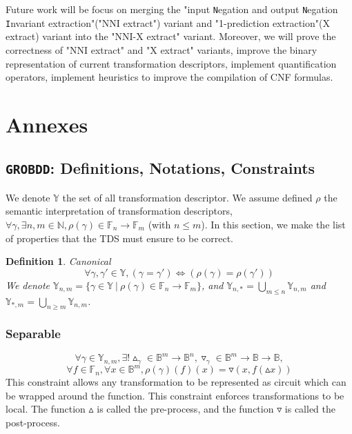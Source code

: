 \documentclass[a4paper,10pt]{article}
\newcommand{\N}{\mathbb{N}}%
\newcommand{\B}{\mathbb{B}}
\newcommand{\F}{\mathbb{F}}
\newcommand{\Y}{\mathbb{Y}}
\newcommand{\NNIextract}{"input \texttt{N}egation and output \texttt{N}egation \texttt{I}nvariant extraction"}
\newcommand{\Xextract}{"1-prediction extraction"}
\newcommand{\GroBdd}{\texttt{GROBDD}}
\newtheorem{newdef}{Definition}
\newcommand{\definition}[2]{\begin{newdef}{#1\\}#2\end{newdef}}
\begin{document}
Future work will be focus on merging the \NNIextract ("NNI extract") variant and \Xextract (X extract) variant into the "NNI-X extract" variant.
Moreover, we will prove the correctness of "NNI extract" and "X extract" variants, improve the binary representation of current transformation descriptors, implement quantification operators, implement heuristics to improve the compilation of CNF formulas.


\newpage
{}


\newpage
\tableofcontents

\newpage

\section{Annexes}

\subsection{\GroBdd{}: Definitions, Notations, Constraints\label{grobdd-def}}

We denote $\Y$ the set of all transformation descriptor.
We assume defined $\rho$ the semantic interpretation of transformation descriptors, $\forall \gamma, \exists n, m \in\N, \rho(\gamma) \in \F_n \rightarrow \F_m$ (with $n\leq m$).
In this section, we make the list of properties that the TDS must ensure to be correct.

\definition{Canonical}
{
\[\forall \gamma, \gamma' \in \Y, \left( \gamma = \gamma' \right) \Leftrightarrow \left( \rho(\gamma) = \rho(\gamma') \right) \]
We denote $\Y_{n, m} = \{ \gamma \in \Y ~|~ \rho(\gamma) \in \F_n \longrightarrow \F_m \}$, and $\Y_{n,*} = \bigcup_{m\leq n} \Y_{n, m}$ and $\Y_{*, m} = \bigcup_{n \geq m} \Y_{n, m}$.
}

\subsubsection{Separable}
\[\forall \gamma \in \Y_{n, m}, \exists! \vartriangle_\gamma \in \B^m \rightarrow \B^n, \triangledown_\gamma \in \B^m \rightarrow \B \rightarrow \B,\]
\[\forall f\in \F_n, \forall x \in \B^m, \rho(\gamma)(f)(x) = \triangledown(x, f(\vartriangle x))\]
This constraint allows any transformation to be represented as circuit which can be wrapped around the function.
This constraint enforces transformations to be local.
The function $\vartriangle$ is called the pre-process, and the function $\triangledown$ is called the post-process.
\end{document}
